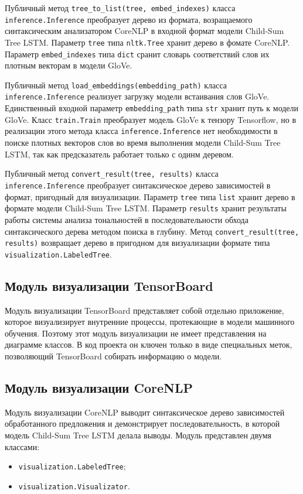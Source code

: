 Публичный метод \texttt{tree\_to\_list(tree, embed\_indexes)} класса \texttt{inference.Inference} преобразует дерево из формата, возращаемого синтаксическим анализатором CoreNLP в входной формат модели Child-Sum Tree LSTM\@. Параметр \texttt{tree} типа \texttt{nltk.Tree} хранит дерево в фомате CoreNLP\@. Параметр \texttt{embed\_indexes} типа \texttt{dict} сранит словарь соответствий слов их плотным векторам в модели GloVe.

Публичный метод \texttt{load\_embeddings(embedding\_path)} класса \texttt{inference.Inference} реализует загрузку модели встаивания слов GloVe. Единственный входной параметр \texttt{embedding\_path} типа \texttt{str} хранит путь к модели GloVe. Класс \texttt{train.Train} преобразует модель GloVe к тензору Tensorflow, но в реализации этого метода класса \texttt{inference.Inference} нет необходимости в поиске плотных векторов слов во время выполнения модели Child-Sum Tree LSTM, так как предсказатель работает только с одинм деревом.

Публичный метод \texttt{convert\_result(tree, results)} класса \texttt{inference.Inference} преобразует синтаксическое дерево зависимостей в формат, пригодный для визуализации. Параметр \texttt{tree} типа \texttt{list} хранит дерево в формате модели Child-Sum Tree LSTM\@. Параметр \texttt{results} хранит результаты работы системы анализа тональностей в последовательности обхода синтаксического дерева методом поиска в глубину. Метод \texttt{convert\_result(tree, results)} возвращает дерево в пригодном для визуализации формате типа \texttt{visualization.LabeledTree}.

\subsection{Модуль визуализации TensorBoard}
Модуль визуализации TensorBoard представляет собой отдельно приложение, которое визуализирует внутренние процессы, протекающие в модели машинного обучения. Поэтому этот модуль визуализации не имеет представления на диаграмме классов. В код проекта он ключен только в виде специальных меток, позволяющий TensorBoard собирать информацию о модели.

\subsection{Модуль визуализации CoreNLP}
Модуль визуализации CoreNLP выводит синтаксическое дерево зависимостей обработанного предложения и демонстрирует последовательность, в которой модель Child-Sum Tree LSTM делала выводы. Модуль представлен двумя классами:
\begin{itemize}
\item \texttt{visualization.LabeledTree};
\item \texttt{visualization.Visualizator}.
\end{itemize}

